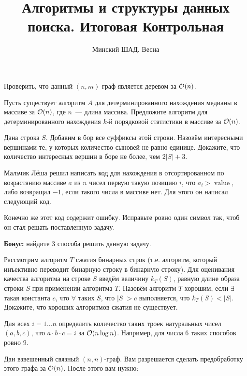 \documentclass[addpoints]{exam}
\title{Алгоритмы и структуры данных поиска. Итоговая Контрольная}
\author{Минский ШАД. Весна}
\DeclareMathOperator{\myvalue}{value}
\begin{document}
\maketitle

\begin{questions}

\question Проверить, что данный $(n,m)$-граф является деревом за $\mathcal{O}(n)$.

\question Пусть существует алгоритм $A$ для детерминированного нахождения медианы в массиве за $\mathcal{O}(n)$, где $n$~--- длина массива. Предложите алгоритм для детерминированного нахождения $k$-й порядковой статистики в массиве за $\mathcal{O}(n)$.

\question Дана строка $S$. Добавим в бор все суффиксы этой строки. Назовём интересными вершинами те, у которых количество сыновей не равно единице. Докажите, что количество интересных вершин в боре не более, чем $2|S| + 3$.

\question Мальчик Лёша решил написать код для нахождения в отсортированном по возрастанию массиве $a$ из $n$ чисел первую такую позицию $i$, что $a_i > \myvalue$, либо возвращал $-1$, если такого числа в массиве нет. Для этого он написал следующий код.



Конечно же этот код содержит ошибку. Исправьте ровно один символ так, чтоб он стал решать поставленную задачу.

\textbf{Бонус:} найдите 3 способа решить данную задачу.

\question Рассмотрим алгоритм $T$ сжатия бинарных строк (т.е. алгоритм, который инъективно переводит бинарную строку в бинарную строку). Для оценивания качества алгоритма на строке $S$ введём величину $k_T(S)$, равную длине образа строки $S$ при применении алгоритма $T$. Назовём алгоритм $T$ хорошим, если $\exists$ такая константа $c$, что $\forall$ таких $S$, что $|S| > c$ выполняется, что $k_T(S) < |S|$. Докажите, что хороших алгоритмов сжатия не существует.

\question Для всех $i= \overline{1\ldots n}$ определить количество таких троек натуральных чисел $(a,b,c)$, что $a \cdot b \cdot c = i$ за $\mathcal{O}(n \log{n})$. Например, для числа $6$ таких способов ровно $9$.

\question Дан взвешенный связный $(n,n)$-граф. Вам разрешается сделать предобработку этого графа за $\mathcal{O}(n)$. После этого вам нужно:

\end{questions}
\end{document}
